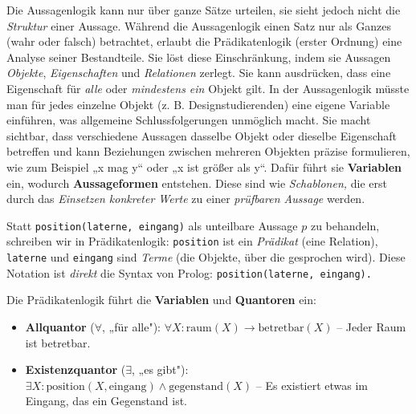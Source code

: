 \documentclass[parskip=half,a4paper,11pt]{scrreprt}
\begin{document}
Die Aussagenlogik kann nur über ganze Sätze urteilen,  sie sieht jedoch nicht die \textit{Struktur} einer Aussage. Während die Aussagenlogik einen Satz nur als Ganzes (wahr oder falsch) betrachtet, erlaubt die Prädikatenlogik (erster Ordnung) eine Analyse seiner Bestandteile. Sie löst diese Einschränkung, indem sie Aussagen  \textit{Objekte}, \textit{Eigenschaften} und \textit{Relationen} zerlegt. Sie kann ausdrücken, dass eine Eigenschaft für \textit{alle} oder \textit{mindestens ein} Objekt gilt. In der Aussagenlogik müsste man für jedes einzelne Objekt (z. B. Designstudierenden) eine eigene Variable einführen, was allgemeine Schlussfolgerungen unmöglich macht. Sie macht sichtbar, dass verschiedene Aussagen dasselbe Objekt oder dieselbe Eigenschaft betreffen und kann Beziehungen zwischen mehreren Objekten präzise formulieren, wie zum Beispiel „x mag y“ oder „x ist größer als y“. Dafür führt sie \textbf{Variablen} ein, wodurch \textbf{Aussageformen} entstehen. Diese sind wie \textit{Schablonen,} die erst durch das\textit{ Einsetzen konkreter Werte} zu einer \textit{prüfbaren Aussage} werden.

Statt \texttt{position(laterne, eingang)} als unteilbare Aussage $p$ zu behandeln, schreiben wir in Prädikatenlogik: \texttt{position} ist ein \textit{Prädikat} (eine Relation), \texttt{laterne} und \texttt{eingang} sind \textit{Terme} (die Objekte, über die gesprochen wird). Diese Notation ist \textit{direkt} die Syntax von Prolog: \texttt{position(laterne, eingang).}

Die Prädikatenlogik führt die \textbf{Variablen} und \textbf{Quantoren} ein:

\begin{itemize}
    \item \textbf{Allquantor} ($\forall$, „für alle"): $\forall X\colon \text{raum}(X) \rightarrow \text{betretbar}(X)$ – Jeder Raum ist betretbar.
    \item \textbf{Existenzquantor} ($\exists$, „es gibt"): $\exists X\colon \text{position}(X, \text{eingang}) \land \text{gegenstand}(X)$ – Es existiert etwas im Eingang, das ein Gegenstand ist.\\
\end{itemize}
\end{document}
